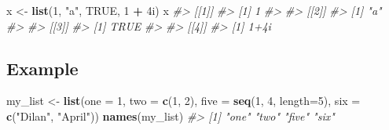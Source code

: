 \documentclass[
]{book}
\newenvironment{Shaded}{\begin{snugshade}}{\end{snugshade}}
\newcommand{\AttributeTok}[1]{\textcolor[rgb]{0.13,0.29,0.53}{#1}}
\newcommand{\CommentTok}[1]{\textcolor[rgb]{0.56,0.35,0.01}{\textit{#1}}}
\newcommand{\ConstantTok}[1]{\textcolor[rgb]{0.56,0.35,0.01}{#1}}
\newcommand{\DataTypeTok}[1]{\textcolor[rgb]{0.13,0.29,0.53}{#1}}
\newcommand{\DecValTok}[1]{\textcolor[rgb]{0.00,0.00,0.81}{#1}}
\newcommand{\FunctionTok}[1]{\textcolor[rgb]{0.13,0.29,0.53}{\textbf{#1}}}
\newcommand{\NormalTok}[1]{#1}
\newcommand{\OtherTok}[1]{\textcolor[rgb]{0.56,0.35,0.01}{#1}}
\newcommand{\SpecialCharTok}[1]{\textcolor[rgb]{0.81,0.36,0.00}{\textbf{#1}}}
\newcommand{\StringTok}[1]{\textcolor[rgb]{0.31,0.60,0.02}{#1}}
\begin{document}
\begin{Shaded}
\begin{Highlighting}[]
\NormalTok{x }\OtherTok{\textless{}{-}} \FunctionTok{list}\NormalTok{(}\DecValTok{1}\NormalTok{, }\StringTok{"a"}\NormalTok{, }\ConstantTok{TRUE}\NormalTok{, }\DecValTok{1} \SpecialCharTok{+} \DecValTok{4}\DataTypeTok{i}\NormalTok{) }
\NormalTok{x}
\CommentTok{\#\textgreater{} [[1]]}
\CommentTok{\#\textgreater{} [1] 1}
\CommentTok{\#\textgreater{} }
\CommentTok{\#\textgreater{} [[2]]}
\CommentTok{\#\textgreater{} [1] "a"}
\CommentTok{\#\textgreater{} }
\CommentTok{\#\textgreater{} [[3]]}
\CommentTok{\#\textgreater{} [1] TRUE}
\CommentTok{\#\textgreater{} }
\CommentTok{\#\textgreater{} [[4]]}
\CommentTok{\#\textgreater{} [1] 1+4i}
\end{Highlighting}
\end{Shaded}

\subsection*{Example}\label{example-1}

\begin{Shaded}
\begin{Highlighting}[]
\NormalTok{my\_list }\OtherTok{\textless{}{-}} \FunctionTok{list}\NormalTok{(}\AttributeTok{one =} \DecValTok{1}\NormalTok{, }\AttributeTok{two =} \FunctionTok{c}\NormalTok{(}\DecValTok{1}\NormalTok{, }\DecValTok{2}\NormalTok{), }\AttributeTok{five =} \FunctionTok{seq}\NormalTok{(}\DecValTok{1}\NormalTok{, }\DecValTok{4}\NormalTok{, }\AttributeTok{length=}\DecValTok{5}\NormalTok{),}
          \AttributeTok{six =} \FunctionTok{c}\NormalTok{(}\StringTok{"Dilan"}\NormalTok{, }\StringTok{"April"}\NormalTok{))}
\FunctionTok{names}\NormalTok{(my\_list)}
\CommentTok{\#\textgreater{} [1] "one"  "two"  "five" "six"}
\end{Highlighting}
\end{Shaded}

\begin{Shaded}
\end{Shaded}
\end{document}
